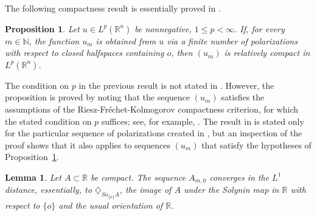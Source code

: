 \documentclass[12pt,reqno]{amsart}
\newcommand{\N}{{\mathbb N}}
\newcommand{\R}{{\mathbb R}}
\newtheorem{lem}[thm]{Lemma}
\newtheorem{prop}[thm]{Proposition}
\newcommand{\di}{\diamondsuit}
\numberwithin{equation}{section}
\begin{document}
The following compactness result is essentially proved in \cite[Lemma~3]{VS2}.

\begin{prop}\label{compactness}
Let $u\in L^p(\R^n)$ be nonnegative, $1\leq p <\infty$. If, for every $m\in \N$, the function $u_m$ is obtained from $u$ via a finite number of polarizations with respect to closed halfspaces containing $o$, then $(u_m)$ is relatively compact in $L^p(\R^n)$.
\end{prop}

The condition on $p$ in the previous result is not stated in \cite{VS2}.  However, the proposition is proved by noting that the sequence $(u_m)$ satisfies the assumptions of the Riesz-Fr\'echet-Kolmogorov compactness criterion, for which the stated condition on $p$ suffices; see, for example, \cite[Corollary~4.27]{Bre}.  The result in \cite[Lemma~3]{VS2} is stated only for the particular sequence of polarizations created in \cite{VS2}, but an inspection of the proof shows that it also applies to sequences $(u_m)$ that satisfy the hypotheses of Proposition~\ref{compactness}.

\begin{lem}\label{gablem}
Let $A\subset \R$ be compact. The sequence $A_{m,0}$ converges in the $L^1$ distance, essentially, to $\di_{So_{\{o\}}A}$, the image of $A$ under the Solynin map in $\R$ with respect to $\{o\}$ and the usual orientation of $\R$.
\end{lem}
\end{document}
